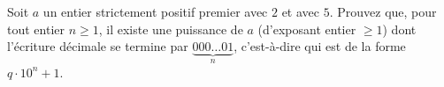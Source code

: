 Soit $a$ un entier strictement positif premier avec $2$ et avec $5$. Prouvez
que, pour tout entier $n \geq 1$, il existe une puissance de $a$ (d'exposant
entier $\geq 1$) dont l'écriture décimale se termine par
$\underbrace{000\ldots01}_{n}$, c'est-à-dire qui est de la forme
$q \cdot 10^n + 1$.
